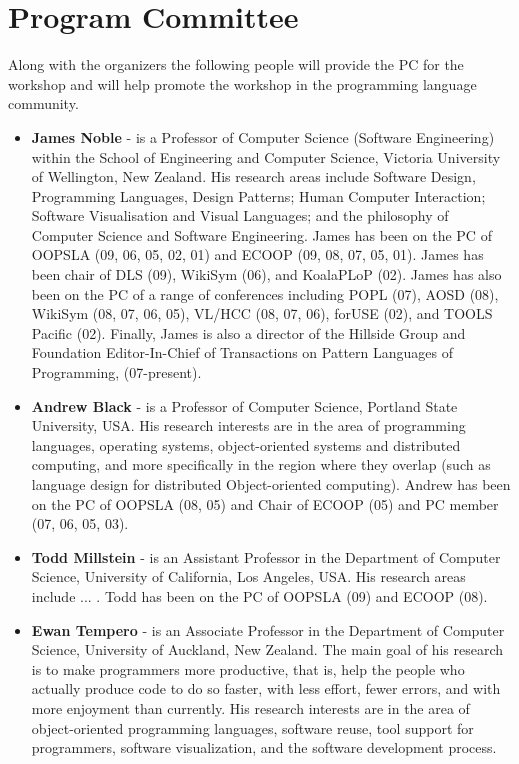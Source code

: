 \documentclass{acm_proc_article-sp}
\begin{document}
\section{Program Committee}

Along with the organizers the following people will provide the PC for
the workshop and will help promote the workshop in the programming
language community.

\begin{itemize}
\item \textbf{James Noble} - is a Professor of Computer Science (Software Engineering) within the School of 
Engineering and Computer Science, Victoria University of Wellington, New Zealand. 
His research areas include Software Design, Programming Languages, Design Patterns; 
Human Computer Interaction; Software Visualisation and Visual Languages; and the philosophy of Computer Science and Software Engineering. James has been on the PC of OOPSLA (09, 06, 05, 02, 01) and ECOOP (09, 08, 07,  05, 01). James has been chair of DLS (09), WikiSym (06), and KoalaPLoP (02). James has also been on the PC of a range of conferences including POPL (07), AOSD (08), WikiSym (08, 07, 06, 05), VL/HCC (08, 07, 06), forUSE (02), and TOOLS Pacific (02). Finally, James is also a director of the Hillside Group and Foundation Editor-In-Chief of Transactions on Pattern Languages of Programming, (07-present).

\item \textbf{Andrew Black} - is a Professor of Computer Science, Portland State University, USA. His research interests are in the area of programming languages, operating systems, object-oriented systems and distributed computing, and more specifically in the region where they overlap (such as language design for distributed Object-oriented computing). Andrew has been on the PC of OOPSLA (08, 05) and Chair of ECOOP (05) and PC member (07, 06, 05, 03).

\item \textbf{Todd Millstein} - is an Assistant Professor in the Department of Computer Science, University of California, Los Angeles, USA. His research areas include ... . Todd has been on the PC of OOPSLA (09) and ECOOP (08).

\item \textbf{Ewan Tempero} - is an Associate Professor in the Department of Computer Science, University of Auckland, New Zealand. The main goal of his research is to make programmers more productive, that is, help the people who actually produce code to do so faster, with less effort, fewer errors, and with more enjoyment than currently. His research interests are in the area of object-oriented programming languages, software reuse, tool support for programmers, software visualization, and the software development process.


\end{itemize}
\end{document}
